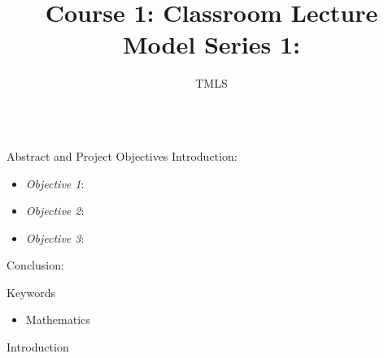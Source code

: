 \documentclass[final]{beamer}
\title{Course 1: Classroom Lecture Model Series 1:} %
\author{TMLS} %
\institute{The Mathematical Learning Space (TMLS)} %
\newlength{\onecolwid}
\theoremstyle{definition}
\begin{document}
\setlength{\belowcaptionskip}{2ex}
\setlength\belowdisplayshortskip{2ex}
\begin{frame}[t]
\begin{columns}[t]
\begin{column}{\onecolwid} %
\begin{alertblock}{Abstract and Project Objectives}
Introduction:
\begin{itemize}
\item \textit{Objective 1}: 
\item \textit{Objective 2}: 
\item \textit{Objective 3}: 
\end{itemize}
Conclusion:
\end{alertblock}
\begin{block}{Keywords}
\begin{itemize}
\item Mathematics
\end{itemize}	
\end{block}
\begin{alertblock}{Introduction}
\end{alertblock}

\end{column}


\end{columns}
\end{frame}
\end{document}

